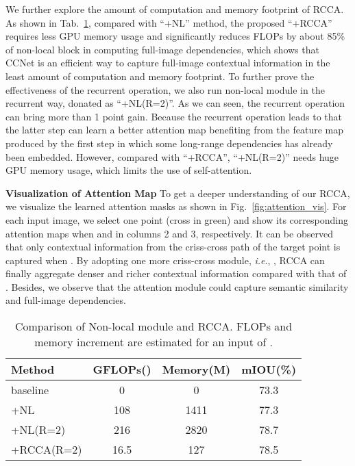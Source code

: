 \documentclass[10pt,journal,compsoc]{IEEEtran}
\def\ie{\emph{i.e}.} \def\Ie{\emph{I.e}.}
\newcommand{\red}[1]{#1}
\begin{document}
We further explore the amount of computation and memory footprint of RCCA. As shown in Tab.~\ref{tab:ablation_resource_usage}, compared with ``+NL'' method,  the proposed ``+RCCA'' requires  less GPU memory usage and significantly reduces FLOPs by about 85\% of non-local block in computing full-image dependencies, which shows that CCNet is an efficient way to capture full-image contextual information in the least amount of computation and memory footprint. \red{To further prove the effectiveness of the recurrent operation, we also run non-local module in the recurrent way, donated as ``+NL(R=2)''. As we can seen, the recurrent operation can bring more than 1 point gain. Because the recurrent operation leads to that the latter step can learn a better attention map benefiting from the feature map produced by the first step in which some long-range dependencies has already been embedded. However, compared with ``+RCCA'', ``+NL(R=2)'' needs huge GPU  memory usage, which limits the use of self-attention.}

\vspace{1em}
\noindent\textbf{Visualization of Attention Map}
To get a deeper understanding of our RCCA, we visualize the learned attention masks as shown in Fig.~\ref{fig:attention_vis}.  For each input image, we select one point (cross in green) and show its corresponding attention maps when  and  in columns 2 and 3, respectively. It can be observed that only contextual information from the criss-cross path of the target point is captured when . By adopting one more criss-cross module, \ie, , RCCA can finally aggregate denser and richer contextual information compared with that of . Besides, we observe that the attention module could capture semantic similarity and full-image dependencies. 
    
    \begin{table}[!t]
        \renewcommand{\arraystretch}{1.3}
        \setlength{\tabcolsep}{0.4em}
        \caption{Comparison of Non-local module and RCCA. FLOPs and memory increment are estimated for an input of .}
        \label{tab:ablation_resource_usage}
        \centering \small
        \begin{tabular}{|l|c|c|c|}
            \hline
            Method & GFLOPs() & Memory(M) & mIOU(\%)  \\
            \hline
            baseline & 0 & 0 & 73.3 \\
+NL & 108 & 1411 & 77.3 \\
            +NL(R=2) & 216 & 2820 & 78.7 \\
            +RCCA(R=2) & 16.5 & 127 & 78.5\\
            \hline
        \end{tabular}
    \end{table}
    
\end{document}

